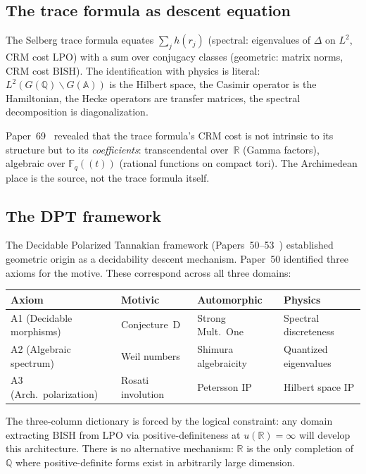 \documentclass[11pt]{article}
\theoremstyle{definition}
\theoremstyle{remark}
\newcommand{\Q}{\mathbb{Q}}
\newcommand{\R}{\mathbb{R}}
\newcommand{\Fq}{\mathbb{F}_q}
\newcommand{\A}{\mathbb{A}}
\newcommand{\BISH}{\mathrm{BISH}}
\newcommand{\LPO}{\mathrm{LPO}}
\begin{document}
\subsection{The trace formula as descent equation}

The Selberg trace formula equates $\sum_j h(r_j)$ (spectral: eigenvalues of $\Delta$ on $L^2$, CRM cost $\LPO$) with a sum over conjugacy classes (geometric: matrix norms, CRM cost $\BISH$). The identification with physics is literal: $L^2(G(\Q) \backslash G(\A))$ is the Hilbert space, the Casimir operator is the Hamiltonian, the Hecke operators are transfer matrices, the spectral decomposition is diagonalization.

Paper~69~\cite{Paper69} revealed that the trace formula's CRM cost is not intrinsic to its structure but to its \emph{coefficients}: transcendental over~$\R$ (Gamma factors), algebraic over $\Fq((t))$ (rational functions on compact tori). The Archimedean place is the source, not the trace formula itself.

\subsection{The DPT framework}

The Decidable Polarized Tannakian framework (Papers~50--53~\cite{Paper50}) established geometric origin as a decidability descent mechanism. Paper~50 identified three axioms for the motive. These correspond across all three domains:

\begin{center}
\begin{tabular}{llll}
\toprule
\textbf{Axiom} & \textbf{Motivic} & \textbf{Automorphic} & \textbf{Physics} \\
\midrule
A1 (Decidable morphisms) & Conjecture~D & Strong Mult.\ One & Spectral discreteness \\
A2 (Algebraic spectrum) & Weil numbers & Shimura algebraicity & Quantized eigenvalues \\
A3 (Arch.\ polarization) & Rosati involution & Petersson IP & Hilbert space IP \\
\bottomrule
\end{tabular}
\end{center}

The three-column dictionary is forced by the logical constraint: any domain extracting $\BISH$ from $\LPO$ via positive-definiteness at $u(\R) = \infty$ will develop this architecture. There is no alternative mechanism: $\R$ is the only completion of~$\Q$ where positive-definite forms exist in arbitrarily large dimension.
\end{document}
